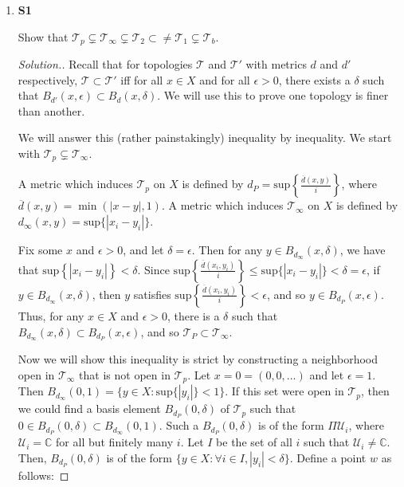 \documentclass{article}
\newcommand{\T}{\mathcal{T}}
\newcommand{\U}{\mathcal{U}}
\newcommand{\C}{\mathbb{C}}
\newcommand{\sk}{\smallskip}
\begin{document}
\begin{enumerate}
\begin{proof}[Solution.]
    
        
    \end{proof}

    \item \textbf{S1}
    
    Show that $\T_p \subsetneq \T_\infty \subsetneq \T_2 \subset\neq \T_1 \subsetneq \T_b$. 

    \sk

    \begin{proof}[Solution.]

    Recall that for topologies $\T$ and $\T'$ with metrics $d$ and $d'$ respectively, $\T \subset \T'$ iff for all $x \in X$ and for all $\epsilon > 0$, there exists a $\delta$ such that $B_{d'}(x, \epsilon) \subset B_{d}(x, \delta)$. We will use this to prove one topology is finer than another.

    \sk

    We will answer this (rather painstakingly) inequality by inequality. We start with $\T_p \subsetneq \T_\infty$.

    \sk 

    A metric which induces $\T_p$ on $X$ is defined by $d_P = \text{sup}\left\{\frac{\overline{d}(x, y)}{i}\right\}$, where $\overline{d}(x, y) = \min(|x - y|, 1)$. A metric which induces $\T_\infty$ on $X$ is defined by $d_\infty(x, y) = \text{sup}\{|x_i - y_i|\}$. 

    \sk 

    Fix some $x$ and $\epsilon > 0$, and let $\delta = \epsilon$. Then for any $y \in B_{d_\infty}(x, \delta)$, we have that $\text{sup}\left\{|x_i - y_i|\right\} < \delta$. Since $\text{sup}\left\{\frac{\overline{d}(x_i, y_i)}{i}\right\} \leq \text{sup}\{|x_i - y_i|\} < \delta = \epsilon$, if $y \in B_{d_\infty}(x, \delta)$, then $y$ satisfies $\text{sup}\left\{\frac{\overline{d}(x_i, y_i)}{i}\right\} < \epsilon$, and so $y \in B_{d_P}(x, \epsilon)$. Thus, for any $x \in X$ and $\epsilon > 0$, there is a $\delta$ such that $B_{d_\infty}(x, \delta) \subset B_{d_P}(x, \epsilon)$, and so $\T_P \subset \T_\infty$.

    \sk

    Now we will show this inequality is strict by constructing a neighborhood open in $\T_\infty$ that is not open in $\T_p$. Let $x = 0 = (0, 0, \dots)$ and let $\epsilon = 1$. Then $B_{d_\infty}(0, 1) = \{y \in X : \text{sup}\{|y_i|\} < 1\}$. If this set were open in $\T_p$, then we could find a basis element $B_{d_P}(0, \delta)$ of $\T_p$ such that $0 \in B_{d_P}(0, \delta) \subset B_{d_\infty}(0, 1)$. Such a $B_{d_P}(0, \delta)$ is of the form $\Pi \U_i$, where $\U_i = \C$ for all but finitely many $i$. Let $I$ be the set of all $i$ such that $\U_i \neq \C$. Then, $B_{d_P}(0, \delta)$ is of the form $\{y \in X: \forall i \in I, |y_i| < \delta\}$. Define a point $w$ as follows:


\end{proof}
\end{enumerate}
\end{document}
